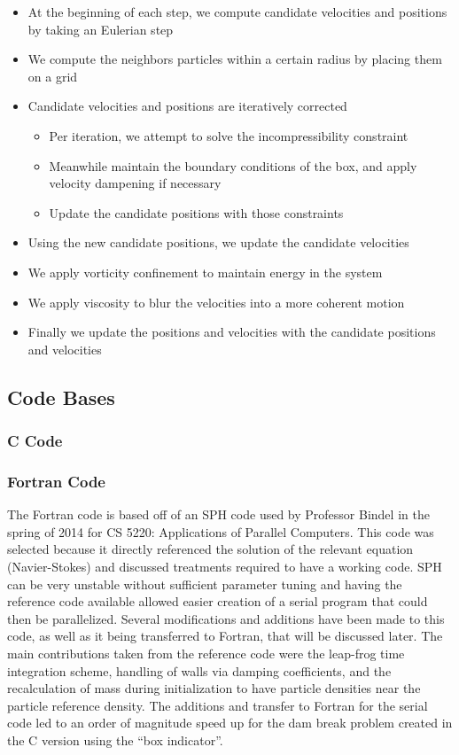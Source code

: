 \documentclass{scrartcl}
\begin{document}
    \begin{itemize}
        \item At the beginning of each step, we compute candidate velocities and positions by taking an Eulerian step
        \item We compute the neighbors particles within a certain radius by placing them on a grid
        \item Candidate velocities and positions are iteratively corrected
        \begin{itemize}
            \item Per iteration, we attempt to solve the incompressibility constraint
            \item Meanwhile maintain the boundary conditions of the box, and apply velocity dampening if necessary
            \item Update the candidate positions with those constraints
        \end{itemize}
        \item Using the new candidate positions, we update the candidate velocities
        \item We apply vorticity confinement to maintain energy in the system
        \item We apply viscosity to blur the velocities into a more coherent motion
        \item Finally we update the positions and velocities with the candidate positions and velocities
    \end{itemize}
    
    \subsection{Code Bases}
    \subsubsection{C Code}
    
    \subsubsection{Fortran Code}
    The Fortran code is based off of an SPH code used by Professor Bindel in the spring of 2014 for CS 5220: Applications of Parallel Computers. This code was selected because it directly referenced the solution of the relevant equation (Navier-Stokes) and discussed treatments required to have a working code. SPH can be very unstable without sufficient parameter tuning and having the reference code available allowed easier creation of a serial program that could then be parallelized. Several modifications and additions have been made to this code, as well as it being transferred to Fortran, that will be discussed later. The main contributions taken from the reference code were the leap-frog time integration scheme, handling of walls via damping coefficients, and the recalculation of mass during initialization to have particle densities near the particle reference density. The additions and transfer to Fortran for the serial code led to an order of magnitude speed up for the dam break problem created in the C version using the ``box indicator''. 
    
\end{document}
